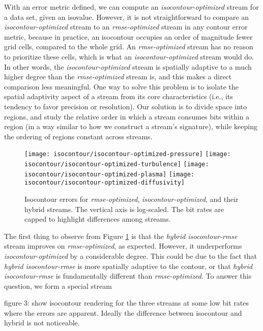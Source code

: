 With an error metric defined, we can compute an \emph{isocontour-optimized} stream for a data set,
given an isovalue. However, it is not straightforward to compare an \emph{isocontour-optimized}
stream to an \emph{rmse-optimized} stream in any contour error metric, because in practice, an
isocontour occupies an order of magnitude fewer grid cells, compared to the whole grid. An
\emph{rmse-optimized} stream has no reason to prioritize these cells, which is what an
\emph{isocontour-optimized} stream would do. In other words, the \emph{isocontour-optimized} stream
is spatially adaptive to a much higher degree than the \emph{rmse-optimized} stream is, and this
makes a direct comparison less meaningful. One way to solve this problem is to isolate the spatial
adaptivity aspect of a stream from its core characteristics (i.e., its tendency to favor precision
or resolution). Our solution is to divide space into regions, and study the relative order in which
a stream consumes bits within a region (in a way similar to how we construct a stream's signature),
while keeping the ordering of regions constant across streams.

\begin{figure}
	\centering
	{\texttt{[image: isocontour/isocontour-optimized-pressure]}}
	{\texttt{[image: isocontour/isocontour-optimized-turbulence]}}
	{\texttt{[image: isocontour/isocontour-optimized-plasma]}}
	{\texttt{[image: isocontour/isocontour-optimized-diffusivity]}}
	\caption{Isocontour errors for \emph{rmse-optimized}, \emph{isocontour-optimized}, and their
	hybrid streams. The vertical axis is log-scaled. The bit rates are capped to highlight differences
	among streams.}
	\label{fig:isocontour-plots}
\end{figure}

The first thing to observe from Figure \ref{fig:isocontour-plots} is that the \emph{hybrid
isocontour-rmse} stream improves on \emph{rmse-optimized}, as expected. However, it underperforms
\emph{isocontour-optimized} by a considerable degree. This could be due to the fact that
\emph{hybrid isocontour-rmse} is more spatially adaptive to the contour, or that \emph{hybrid
isocontour-rmse} is fundamentally different than \emph{rmse-optimized}. To answer this question, we
form a special stream 

figure 3: show isocontour rendering for the three streams at some low bit rates where the errors are
apparent. Ideally the difference between isocontour and hybrid is not noticeable.

